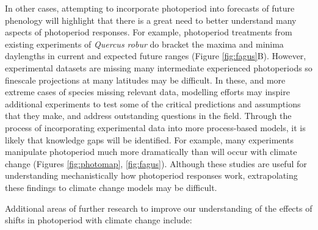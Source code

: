 \documentclass{article}
\begin{document}
\par In other cases, attempting to incorporate photoperiod into forecasts of future phenology will highlight that there is a great need to better understand many aspects of photoperiod responses. For example, photoperiod treatments from  existing experiments of \emph{Quercus robur} do bracket the maxima and minima daylengths in current and expected future ranges (Figure \ref{fig:fagus}B). However, experimental datasets are missing many intermediate experienced photoperiods so finescale projections at many latitudes may be difficult. In these, and more extreme cases of species missing relevant data, modelling efforts may inspire additional experiments to test some of the critical predictions and assumptions that they make, and address outstanding questions in the field. Through the process of incorporating experimental data into more process-based models, it is likely that knowledge gaps will be identified. For example, many experiments manipulate photoperiod much more dramatically than will occur with climate change (Figures \ref{fig:photomap}, \ref{fig:fagus}). Although these studies are useful for understanding mechanistically how photoperiod responses work, extrapolating these findings to climate change models may be difficult. %
\par Additional areas of further research to improve our understanding of the effects of shifts in photoperiod with climate change include:
\end{document}
